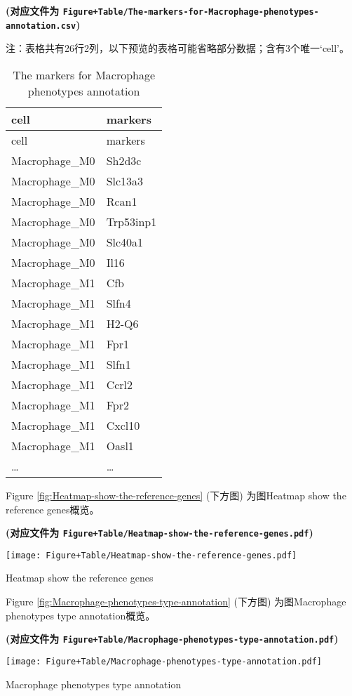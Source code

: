 \documentclass[
]{article}
\begin{document}
\textbf{(对应文件为 \texttt{Figure+Table/The-markers-for-Macrophage-phenotypes-annotation.csv})}

\begin{center}\begin{tcolorbox}[colback=gray!10, colframe=gray!50, width=0.9\linewidth, arc=1mm, boxrule=0.5pt]注：表格共有26行2列，以下预览的表格可能省略部分数据；含有3个唯一`cell'。
\end{tcolorbox}
\end{center}

\begin{longtable}[]{@{}ll@{}}
\caption{\label{tab:The-markers-for-Macrophage-phenotypes-annotation}The markers for Macrophage phenotypes annotation}\tabularnewline
\toprule
cell & markers\tabularnewline
\midrule
\endfirsthead
\toprule
cell & markers\tabularnewline
\midrule
\endhead
Macrophage\_M0 & Sh2d3c\tabularnewline
Macrophage\_M0 & Slc13a3\tabularnewline
Macrophage\_M0 & Rcan1\tabularnewline
Macrophage\_M0 & Trp53inp1\tabularnewline
Macrophage\_M0 & Slc40a1\tabularnewline
Macrophage\_M0 & Il16\tabularnewline
Macrophage\_M1 & Cfb\tabularnewline
Macrophage\_M1 & Slfn4\tabularnewline
Macrophage\_M1 & H2-Q6\tabularnewline
Macrophage\_M1 & Fpr1\tabularnewline
Macrophage\_M1 & Slfn1\tabularnewline
Macrophage\_M1 & Ccrl2\tabularnewline
Macrophage\_M1 & Fpr2\tabularnewline
Macrophage\_M1 & Cxcl10\tabularnewline
Macrophage\_M1 & Oasl1\tabularnewline
\ldots{} & \ldots{}\tabularnewline
\bottomrule
\end{longtable}

Figure \ref{fig:Heatmap-show-the-reference-genes} (下方图) 为图Heatmap show the reference genes概览。

\textbf{(对应文件为 \texttt{Figure+Table/Heatmap-show-the-reference-genes.pdf})}

\def\@captype{figure}
\begin{center}
\texttt{[image: Figure+Table/Heatmap-show-the-reference-genes.pdf]}
\caption{Heatmap show the reference genes}\label{fig:Heatmap-show-the-reference-genes}
\end{center}

Figure \ref{fig:Macrophage-phenotypes-type-annotation} (下方图) 为图Macrophage phenotypes type annotation概览。

\textbf{(对应文件为 \texttt{Figure+Table/Macrophage-phenotypes-type-annotation.pdf})}

\def\@captype{figure}
\begin{center}
\texttt{[image: Figure+Table/Macrophage-phenotypes-type-annotation.pdf]}
\caption{Macrophage phenotypes type annotation}\label{fig:Macrophage-phenotypes-type-annotation}
\end{center}
\end{document}
